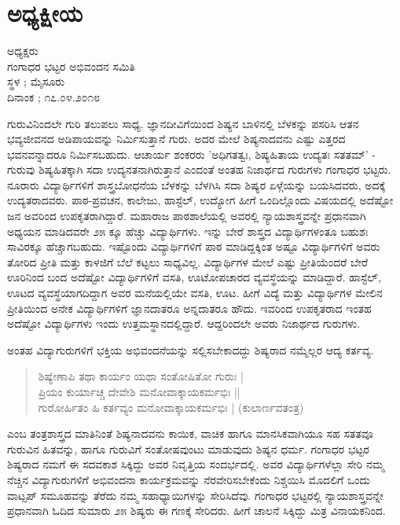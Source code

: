 \chapter{ಅಧ್ಯಕ್ಷೀಯ}

\begin{center}
\smallskip
ಅಧ್ಯಕ್ಷರು\\
ಗಂಗಾಧರ ಭಟ್ಟರ ಅಭಿವಂದನ ಸಮಿತಿ\\
ಸ್ಥಳ ; ಮೈಸೂರು \\	
ದಿನಾಂಕ ; ೧೭.೦೪.೨೦೧೮

\end{center}
ಗುರುವಿನಿಂದಲೇ ಗುರಿ ತಲುಪಲು ಸಾಧ್ಯ. ಜ್ಞಾನದೀವಿಗೆಯಿಂದ ಶಿಷ್ಯನ ಬಾಳಿನಲ್ಲಿ ಬೆಳಕನ್ನು ಪಸರಿಸಿ ಆತನ ಭವ್ಯಜೀವನದ ಅಡಿಪಾಯವನ್ನು ನಿರ್ಮಿಸುತ್ತಾನೆ ಗುರು. ಅದರ ಮೇಲೆ ಶಿಷ್ಯನಾದವನು ಎಷ್ಟು ಎತ್ತರದ ಭವನವನ್ನಾದರೂ ನಿರ್ಮಿಸಬಹುದು. ಆಚಾರ್ಯ ಶಂಕರರು ’ಅಧಿಗತತ್ವಃ, ಶಿಷ್ಯಹಿತಾಯ ಉದ್ಯತಃ ಸತತಮ್’ - ಗುರುವು ಶಿಷ್ಯಹಿತಕ್ಕಾಗಿ ಸದಾ ಉದ್ಯನತನಾಗಿರುತ್ತಾನೆ ಎಂದಂತೆ ಅಂತಹ ನಿಜಾರ್ಥದ ಗುರುಗಳು ಗಂಗಾಧರ ಭಟ್ಟರು. ನೂರಾರು ವಿದ್ಯಾರ್ಥಿಗಳಿಗೆ ಶಾಸ್ತ್ರಬೋಧನೆಯ ಬೆಳಕನ್ನು ಬೆಳಗಿಸಿ ಸದಾ ಶಿಷ್ಯರ ಏಳ್ಗೆಯನ್ನು ಬಯಸಿದವರು, ಅದಕ್ಕೆ ಉದ್ಯತರಾದವರು. ಪಾಠ-ಪ್ರವಚನ, ಕಾಲೇಜು, ಹಾಸ್ಟೆಲ್, ಉದ್ಯೋಗ ಹೀಗೆ ಒಂದಿಲ್ಲೊಂದು ವಿಷಯದಲ್ಲಿ ಅದೆಷ್ಟೋ ಜನ ಅವರಿಂದ ಉಪಕೃತರಾಗಿದ್ದಾರೆ. ಮಹಾರಾಜ ಪಾಠಶಾಲೆಯಲ್ಲಿ ಅವರಲ್ಲಿ ನ್ಯಾಯಶಾಸ್ತ್ರವನ್ನೇ ಪ್ರಧಾನವಾಗಿ ಅಧ್ಯಯನ ಮಾಡಿದವರೇ ೨೫ ಕ್ಕೂ ಹೆಚ್ಚು ವಿದ್ಯಾರ್ಥಿಗಳು. ಇನ್ನು ಬೇರೆ ಶಾಸ್ತ್ರದ ವಿದ್ಯಾರ್ಥಿಗಳಂತೂ ಬಹುಶಃ ಸಾವಿರಕ್ಕೂ ಹೆಚ್ಚಾಗಬಹುದು. ಇಷ್ಟೊಂದು ವಿದ್ಯಾರ್ಥಿಗಳಿಗೆ ಪಾಠ ಮಾಡಿದ್ದಕ್ಕಿಂತ ಅಷ್ಟೂ ವಿದ್ಯಾರ್ಥಿಗಳಿಗೆ ಅವರು ತೋರಿದ ಪ್ರೀತಿ ಮತ್ತು ಕಾಳಜಿಗೆ ಬೆಲೆ ಕಟ್ಟಲು ಸಾಧ್ಯವಿಲ್ಲ. ವಿದ್ಯಾರ್ಥಿಗಳ ಮೇಲೆ ಎಷ್ಟು ಪ್ರೀತಿಯೆಂದರೆ ಬೇರೆ ಊರಿನಿಂದ ಬಂದ ಅದೆಷ್ಟೋ ವಿದ್ಯಾರ್ಥಿಗಳಿಗೆ ವಸತಿ, ಊಟೋಪಚಾರದ ವ್ಯವಸ್ಥೆಯನ್ನು ಮಾಡಿದ್ದಾರೆ. ಹಾಸ್ಟೆಲ್, ಊಟದ ವ್ಯವಸ್ಥೆಯಾಗದಿದ್ದಾಗ ಅವರ ಮನೆಯಲ್ಲಿಯೇ ವಸತಿ, ಊಟ. ಹೀಗೆ ವಿದ್ಯೆ ಮತ್ತು ವಿದ್ಯಾರ್ಥಿಗಳ ಮೇಲಿನ ಪ್ರೀತಿಯಿಂದ ಅನೇಕ ವಿದ್ಯಾರ್ಥಿಗಳಿಗೆ ಜ್ಞಾನದಾತರೂ ಅನ್ನದಾತರೂ ಹೌದು. ಇವರಿಂದ ಉಪಕೃತರಾದ ಇಂತಹ ಅದೆಷ್ಟೋ ವಿದ್ಯಾರ್ಥಿಗಳು ಇಂದು ಉತ್ತಮಸ್ಥಾನದಲ್ಲಿದ್ದಾರೆ. ಆದ್ದರಿಂದಲೇ ಅವರು ನಿಜಾರ್ಥದ ಗುರುಗಳು.

ಅಂತಹ ವಿದ್ಯಾಗುರುಗಳಿಗೆ ಭಕ್ತಿಯ ಅಭಿವಂದನೆಯನ್ನು ಸಲ್ಲಿಸಬೇಕಾದದ್ದು ಶಿಷ್ಯರಾದ ನಮ್ಮೆಲ್ಲರ ಆದ್ಯ ಕರ್ತವ್ಯ.
\begin{verse}
ಶಿಷ್ಯೇಣಾಪಿ ತಥಾ ಕಾರ್ಯಂ ಯಥಾ ಸಂತೋಷಿತೋ ಗುರುಃ |\\
ಪ್ರಿಯಂ ಕುರ್ಯಾಚ್ಚ ದೇವೇಶಿ ಮನೋವಾಕ್ಕಾಯಕರ್ಮಭಿಃ ||\\
ಗುರೋರ್ಹಿತಂ ಹಿ ಕರ್ತವ್ಯಂ ಮನೋವಾಕ್ಕಾಯಕರ್ಮಭಿಃ | (ಕುಲಾರ್ಣವತಂತ್ರ)
\end{verse}
ಎಂಬ ತಂತ್ರಶಾಸ್ತ್ರದ ಮಾತಿನಿಂತೆ ಶಿಷ್ಯನಾದವನು ಕಾಯಿಕ, ವಾಚಿಕ ಹಾಗೂ ಮಾನಸಿಕವಾಗಿಯೂ ಸಹ ಸತತವೂ ಗುರುವಿನ ಹಿತವನ್ನು, ಹಾಗೂ ಗುರುವಿಗೆ ಸಂತೋಷವುಂಟು ಮಾಡುವುದು ಶಿಷ್ಯನ ಧರ್ಮ. ಗಂಗಾಧರ ಭಟ್ಟರ ಶಿಷ್ಯರಾದ ನಮಗೆ ಈ ಸದವಕಾಶ ಸಿಕ್ಕಿದ್ದು ಅವರ ನಿವೃತ್ತಿಯ ಸಂದರ್ಭದಲ್ಲಿ. ಅವರ ವಿದ್ಯಾರ್ಥಿಗಳೆಲ್ಲಾ ಸೇರಿ ನಮ್ಮ ನೆಚ್ಚಿನ ವಿದ್ಯಾಗುರುಗಳಿಗೆ ಅಭಿವಂದನಾ ಕಾರ್ಯಕ್ರಮವನ್ನು ನೆರವೇರಿಸಬೇಕೆಂದು ನಿಶ್ಚಯಿಸಿ ಮೊದಲಿಗೆ ಒಂದು ವಾಟ್ಸಪ್ ಸಮೂಹವನ್ನು ತೆರೆದು ನಮ್ಮ ಸಹಾಧ್ಯಾಯಿಗಳನ್ನು ಸೇರಿಸಿದೆವು. ಗಂಗಾಧರ ಭಟ್ಟರಲ್ಲಿ ನ್ಯಾಯಶಾಸ್ತ್ರವನ್ನೇ ಪ್ರಧಾನವಾಗಿ ಓದಿದ ಸುಮಾರು ೨೫ ಶಿಷ್ಯರು ಈ ಗಣಕ್ಕೆ ಸೇರಿದರು. ಹೀಗೆ ಚಾಲನೆ ಸಿಕ್ಕಿದ್ದು ಮಿತ್ರ ವಿನಾಯಕನಿಂದ.

